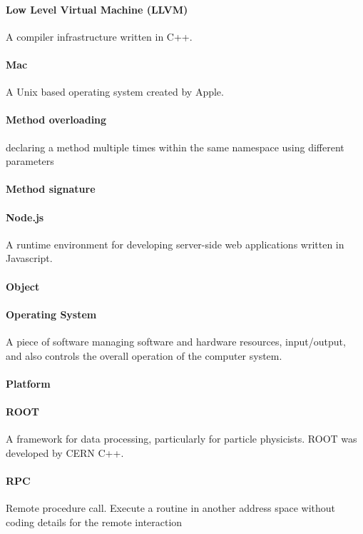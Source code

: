 \paragraph{Low Level Virtual Machine (LLVM)}
A compiler infrastructure written in C++.
\paragraph{Mac}
A Unix based operating system created by Apple.
\paragraph{Method overloading}
declaring a method multiple times within the same namespace using different parameters
\paragraph{Method signature}

\paragraph{Node.js}
A runtime environment for developing server-side web applications written in Javascript.

\paragraph{Object}

\paragraph{Operating System}
A piece of software managing software and hardware resources, input/output, and also controls the overall operation of the computer system.
\paragraph{Platform}

\paragraph{ROOT}
A framework for data processing, particularly for particle physicists. ROOT was developed by CERN C++.


\paragraph{RPC}
Remote procedure call. Execute a routine in another address space without coding details for the remote interaction
